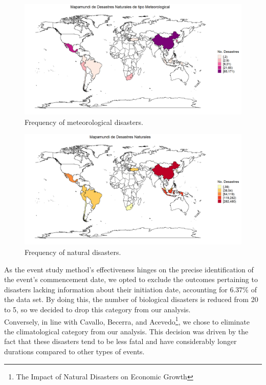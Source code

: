 \documentclass{article}
\begin{document}
\begin{figure}[H]
    \centering
    \includegraphics[width=\textwidth]{Imagenes/Meteorological.png}
    \caption{Frequency of meteorological disasters.}
    \label{fig:meteorological}
\end{figure}
\begin{figure}[H]
    \centering
    \includegraphics[width=\textwidth]{Imagenes/Todos.png}
    \caption{Frequency of natural disasters.}
    \label{fig:todos}
\end{figure}
As the event study method's effectiveness hinges on the precise identification of the event's commencement date, we opted to exclude the outcomes pertaining to disasters lacking information about their initiation date, accounting for 6.37\% of the data set. By doing this, the number of biological disasters is reduced from 20 to 5, so we decided to drop this category from our analysis. \\
Conversely, in line with Cavallo, Becerra, and Acevedo\footnote{The Impact of Natural Disasters on Economic Growth}, we chose to eliminate the climatological category from our analysis. This decision was driven by the fact that these disasters tend to be less fatal and have considerably longer durations compared to other types of events.\\
\end{document}
